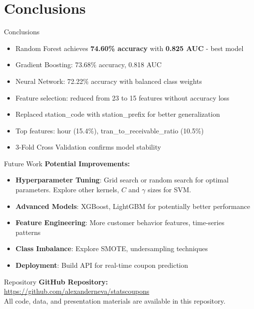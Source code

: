 \documentclass[aspectratio=169]{beamer}
\begin{document}
\section{Conclusions}

\begin{frame}{Conclusions}
\begin{itemize}
    \item Random Forest achieves \textbf{74.60\% accuracy} with \textbf{0.825 AUC} - best model
    \item Gradient Boosting: 73.68\% accuracy, 0.818 AUC
    \item Neural Network: 72.22\% accuracy with balanced class weights
    \item Feature selection: reduced from 23 to 15 features without accuracy loss
    \item Replaced station\_code with station\_prefix for better generalization
    \item Top features: hour (15.4\%), tran\_to\_receivable\_ratio (10.5\%)
    \item 3-Fold Cross Validation confirms model stability
\end{itemize}
\end{frame}

\begin{frame}{Future Work}
\textbf{Potential Improvements:}
\begin{itemize}
    \item \textbf{Hyperparameter Tuning}: Grid search or random search for optimal parameters. Explore other kernels, $C$ and $\gamma$ sizes for SVM.
    \item \textbf{Advanced Models}: XGBoost, LightGBM for potentially better performance
    \item \textbf{Feature Engineering}: More customer behavior features, time-series patterns
    \item \textbf{Class Imbalance}: Explore SMOTE, undersampling techniques
    \item \textbf{Deployment}: Build API for real-time coupon prediction
\end{itemize}
\end{frame}


\begin{frame}{Repository}
\bigskip
\textbf{GitHub Repository:}\\
\textcolor{blue}{\url{https://github.com/alexanderneva/statscoupons}}\\
\bigskip
\bigskip
All code, data, and presentation materials are available in this repository.
\end{frame}
\end{document}

